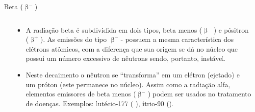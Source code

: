 \documentclass[presentation,professionalfonts,aspectratio=169]{beamer}
\begin{document}
\begin{frame}[label={sec:org3233021}]{Beta (\(\upbeta^-\))}
\begin{columns}
\begin{column}{0.45\columnwidth}
\end{column}

\begin{column}{0.45\columnwidth}
\small

\begin{itemize}
\item A radiação beta é subdividida em dois tipos, beta menos (\(\upbeta ^-\)) e pósitron (\(\upbeta ^+\)). As emissões do tipo \(\upbeta ^-\)- possuem a mesma característica dos elétrons atômicos, com a diferença que sua origem se dá no núcleo que possui um número excessivo de nêutrons sendo, portanto, instável.
\item Neste decaimento o nêutron se “transforma” em um elétron (ejetado) e um próton (este permanece no núcleo). Assim como a  radiação  alfa,  elementos  emissores  de  beta  menos  (\(\upbeta ^-\))  podem  ser  usados  no  tratamento de doenças. Exemplos: lutécio-177 ( ),  ítrio-90 ().
\end{itemize}
\end{column}
\end{columns}
\end{frame}
\end{document}
